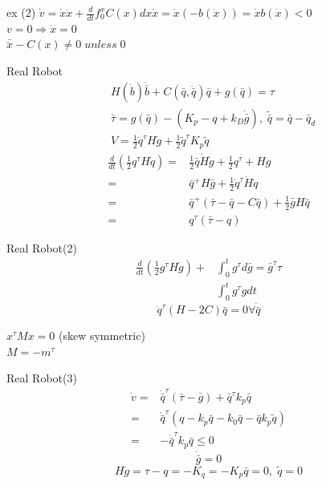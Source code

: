\documentclass{beamer}
\begin{document}
\begin{frame}{ex (2)}
    $\dot{v}=\dot{x}\ddot{x} + \frac{d}{dt}f^x_0 C(x)dx \dot{x} = \dot{x}(-b(\dot{x}))=\dot{x}b(\dot{x})<0$\\
    $v=0 \Rightarrow \dot{x}=0$\\
    $\bar{\ddot{x}}-C(x) \neq 0\; unless\; 0$\\
\end{frame}

\begin{frame}{Real Robot}
    \begin{align*}
        &H(\dot{b})\ddot{\bar{b}}+ C(\bar{q},\ddot{\bar{q}})\bar{q}+g(\bar{q})=\tau\\
        &\bar{\tau}=g(\bar{q})-(K_p-q+k_D\dot{\bar{g}}), \; \tilde{\bar{q}}=\bar{q}-\bar{q}_d\\
        &V=\frac{1}{2}\dot{q}^\tau H \dot{g}+ \frac{1}{2} \tilde{q}^\tau K_p \tilde{q}
    \end{align*}
    \begin{align*}
    \frac{d}{dt}(\frac{1}{2} q^\tau H \dot{q}) =& \frac{1}{2} \bar{q} \dot{H}\dot{g}+\frac{1}{2}q^\tau +Hg\\
    =& \bar{q}^+ H\bar{g}+\frac{1}{2}\dot{q}^\tau \dot{H}\dot{q}\\
    =& \bar{q}^+ (\bar{\tau}-\bar{q}-C\bar{q})+\frac{1}{2}\bar{g}H\bar{q}\\
    =& q^\tau(\bar{\tau}-q)
    \end{align*}
\end{frame}

\begin{frame}{Real Robot(2)}
    \begin{align*}
        \frac{d}{dt} (\frac{1}{2}g^\tau H\dot{g})+&\int_0^t g^\tau d\bar{g} = \bar{g}^\tau \tau\\
        &\int_0^t g^\tau g dt
    \end{align*}
    $$\dot{q}^\tau(H-2C)\bar{q}=0\forall \dot{\bar{q}}$$

    $x^\tau Mx = 0$ (skew symmetric)\\
    $M=-m^\tau$
\end{frame}

\begin{frame}{Real Robot(3)}
    \begin{align*}
        \dot{v} =& \dot{\bar{q}}^\tau (\bar{\tau}-\bar{g})+\bar{q}^\tau k_p \bar{q}\\
        =& \dot{\bar{q}}^\tau(q-k_p \bar{q}-k_0 \bar{q}-\bar{q}k_p \tilde{q})\\
        =& -\dot{\bar{q}}^\tau k_p \bar{q} \leq 0
    \end{align*}
    $$\dot{\bar{g}}=0$$
    $$H\ddot{g}=\tau-q=-K_q=-K_p\bar{q}=0, \; \tilde{q}=0$$
\end{frame}
\end{document}
